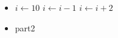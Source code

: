 \begin{itemize}
\item
\begin{algorithmic}
\State $i \gets 10$
    \State $i \gets i-1$
\Else
        \State $i \gets i+2$
    \EndIf
\EndIf
\end{algorithmic}
\item part2
\end{itemize}
